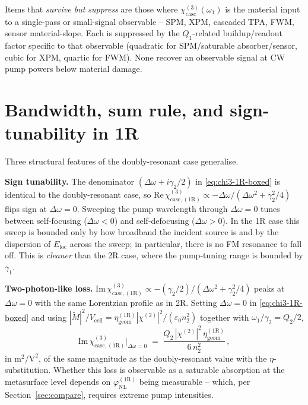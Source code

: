 \documentclass[11pt,a4paper]{article}
\newcommand{\eps}{\varepsilon}
\newcommand{\chitwo}{\chi^{(2)}}
\newcommand{\Dom}{\Delta\omega}
\newcommand{\chicascOneR}{\chi^{(3)}_{\text{casc},(1\mathrm R)}}
\newcommand{\chicasc}{\chi^{(3)}_{\text{casc}}}
\newcommand{\Vunit}{V_{\text{cell}}}
\begin{document}
Items that \emph{survive but suppress} are those where $\chicasc(\omega_1)$
is the material input to a single-pass or small-signal observable -- SPM,
XPM, cascaded TPA, FWM, sensor material-slope.  Each is suppressed by
the $Q_1$-related buildup/readout factor specific to that observable
(quadratic for SPM/saturable absorber/sensor, cubic for XPM, quartic for
FWM).  None recover an observable signal at CW pump powers below
material damage.

\section{Bandwidth, sum rule, and sign-tunability in 1R}\label{sec:sum-1R}

Three structural features of the doubly-resonant case generalise.

\textbf{Sign tunability.}  The denominator $(\Dom+i\gamma_2/2)$ in
\eqref{eq:chi3-1R-boxed} is identical to the doubly-resonant case, so
$\mathrm{Re}\,\chicascOneR\propto-\Dom/(\Dom^{2}+
\gamma_2^{2}/4)$ flips sign at $\Dom=0$.  Sweeping the pump wavelength
through $\Dom=0$ tunes between self-focusing ($\Dom<0$) and self-defocusing
($\Dom>0$).  In the 1R case this sweep is bounded only by how broadband the
incident source is and by the dispersion of $E_\text{loc}$ across the
sweep; in particular, there is no FM resonance to fall off.  This is
\emph{cleaner} than the 2R case, where the pump-tuning range is bounded by
$\gamma_1$.

\textbf{Two-photon-like loss.}
$\mathrm{Im}\,\chicascOneR\propto-(\gamma_2/2)/
(\Dom^{2}+\gamma_2^{2}/4)$ peaks at $\Dom=0$ with the same Lorentzian
profile as in 2R.  Setting $\Dom=0$ in \eqref{eq:chi3-1R-boxed} and using
$|\widetilde M|^{2}/\Vunit=\eta_\text{geom}^{(1\mathrm R)}|\chitwo|^{2}/(\eps_0 n_2^{2})$
together with $\omega_1/\gamma_2=Q_2/2$,
\begin{equation}
  \mathrm{Im}\,\chicascOneR\bigl|_{\Dom=0}
   \;=\;\frac{Q_2\,|\chitwo|^{2}\,\eta_\text{geom}^{(1\mathrm R)}}{6\,n_2^{2}}\,,
  \label{eq:Im-chi3-1R}
\end{equation}
in $\mathrm{m^{2}/V^{2}}$, of the same magnitude as the doubly-resonant
value with the $\eta$-substitution.  Whether this loss is observable as a saturable
absorption at the metasurface level depends on
$\varphi_\text{NL}^{(1\mathrm R)}$ being measurable -- which, per
Section~\ref{sec:compare}, requires extreme pump intensities.
\end{document}
